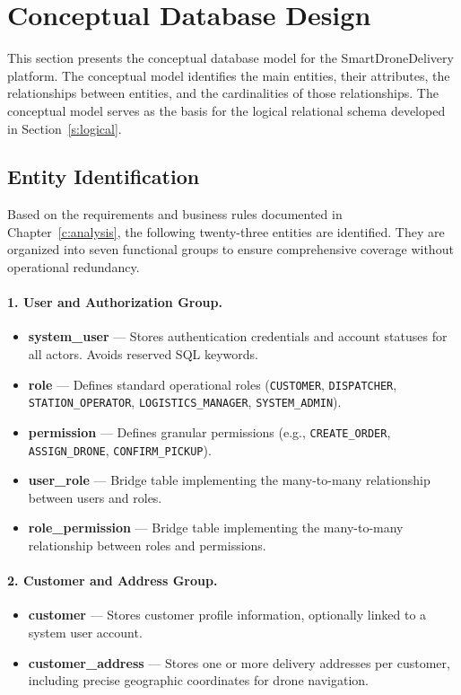 \section{Conceptual Database Design}\label{s:conceptual}

This section presents the conceptual database model for the SmartDroneDelivery platform. The conceptual model identifies the main entities, their attributes, the relationships between entities, and the cardinalities of those relationships. The conceptual model serves as the basis for the logical relational schema developed in Section~\ref{s:logical}.

\subsection{Entity Identification}\label{s:entities}

Based on the requirements and business rules documented in Chapter~\ref{c:analysis}, the following twenty-three entities are identified. They are organized into seven functional groups to ensure comprehensive coverage without operational redundancy.

\paragraph{1. User and Authorization Group.}
\begin{itemize}
    \item \textbf{system\_user} — Stores authentication credentials and account statuses for all actors. Avoids reserved SQL keywords.
    \item \textbf{role} — Defines standard operational roles (\texttt{CUSTOMER}, \texttt{DISPATCHER}, \texttt{STATION\_OPERATOR}, \texttt{LOGISTICS\_MANAGER}, \texttt{SYSTEM\_ADMIN}).
    \item \textbf{permission} — Defines granular permissions (e.g., \texttt{CREATE\_ORDER}, \texttt{ASSIGN\_DRONE}, \texttt{CONFIRM\_PICKUP}).
    \item \textbf{user\_role} — Bridge table implementing the many-to-many relationship between users and roles.
    \item \textbf{role\_permission} — Bridge table implementing the many-to-many relationship between roles and permissions.
\end{itemize}

\paragraph{2. Customer and Address Group.}
\begin{itemize}
    \item \textbf{customer} — Stores customer profile information, optionally linked to a system user account.
    \item \textbf{customer\_address} — Stores one or more delivery addresses per customer, including precise geographic coordinates for drone navigation.
\end{itemize}

